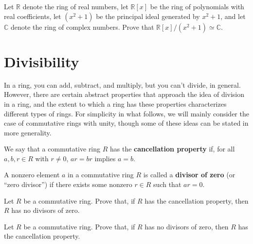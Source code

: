 \begin{problem}\label{prob:cxnumintro}
Let \(\mathbb{R}\) denote the ring of real numbers, let \(\mathbb{R}[x]\) be the ring of polynomials with real coefficients, let \( (x^2+1) \) be the principal ideal generated by \(x^2+1\),  and let \(\mathbb{C}\) denote the ring of complex numbers. Prove that \(\mathbb{R}[x]/( x^2+1) \simeq \mathbb{C} \).
\begin{annotation}
\end{annotation}
\end{problem}

\chapter{Divisibility}
In a ring, you can add, subtract, and multiply, but you can't divide, in general. However, there are certain abstract properties that approach the idea of division in a ring, and the extent to which a ring has these properties characterizes different types of rings. For simplicity in what follows, we will mainly consider the case of commutative rings with unity, though some of these ideas can be stated in more generality.

\begin{definition}
We say that a commutative ring \(R\) has the \textbf{cancellation property} if, for all \(a, b, r \in R\) with \(r\neq 0\), \(ar = br\) implies \(a = b\).
\end{definition}

\begin{definition}
A nonzero element \(a\) in a commutative ring \(R\) is called a \textbf{divisor of zero} (or ``zero divisor'') if there exists some nonzero \(r \in R\) such that \(ar = 0\).
\end{definition}

\begin{problem}
Let \(R\) be a commutative ring. Prove that, if \(R\) has the cancellation property, then \(R\) has no divisors of zero.
\end{problem}

\begin{problem}
Let \(R\) be a commutative ring. Prove that, if \(R\) has no divisors of zero, then \(R\) has the cancellation property.
\end{problem}

